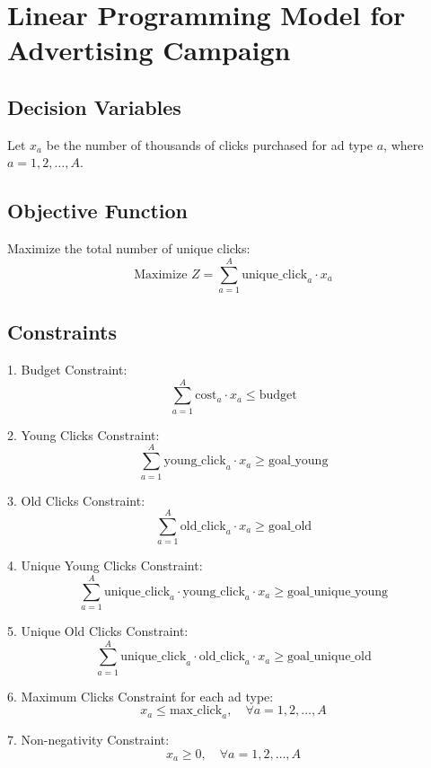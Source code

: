 \documentclass{article}
\begin{document}
\section*{Linear Programming Model for Advertising Campaign}

\subsection*{Decision Variables}
Let \( x_a \) be the number of thousands of clicks purchased for ad type \( a \), where \( a = 1, 2, \ldots, A \).

\subsection*{Objective Function}
Maximize the total number of unique clicks:
\[
\text{Maximize } Z = \sum_{a=1}^{A} \text{unique\_click}_{a} \cdot x_a
\]

\subsection*{Constraints}
1. Budget Constraint:
\[
\sum_{a=1}^{A} \text{cost}_{a} \cdot x_a \leq \text{budget}
\]

2. Young Clicks Constraint:
\[
\sum_{a=1}^{A} \text{young\_click}_{a} \cdot x_a \geq \text{goal\_young}
\]

3. Old Clicks Constraint:
\[
\sum_{a=1}^{A} \text{old\_click}_{a} \cdot x_a \geq \text{goal\_old}
\]

4. Unique Young Clicks Constraint:
\[
\sum_{a=1}^{A} \text{unique\_click}_{a} \cdot \text{young\_click}_{a} \cdot x_a \geq \text{goal\_unique\_young}
\]

5. Unique Old Clicks Constraint:
\[
\sum_{a=1}^{A} \text{unique\_click}_{a} \cdot \text{old\_click}_{a} \cdot x_a \geq \text{goal\_unique\_old}
\]

6. Maximum Clicks Constraint for each ad type:
\[
x_a \leq \text{max\_click}_{a}, \quad \forall a = 1, 2, \ldots, A
\]

7. Non-negativity Constraint:
\[
x_a \geq 0, \quad \forall a = 1, 2, \ldots, A
\]
\end{document}
